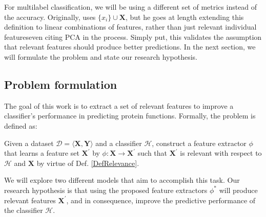 \par\noindent For multilabel classification, we will be using a different set
of metrics instead of the accuracy. Originally, \cite{blum1997selection} uses
$\{x_{i}\} \cup \mathbf{X}$, but he goes at length extending this definition
to linear combinations of features, rather than just relevant individual
features\textemdash even citing PCA in the process. Simply put, this
validates the assumption that relevant features should produce better
predictions. In the next section, we will formulate the problem and state our
research hypothesis.

\subsection{Problem formulation}

\par The goal of this work is to extract a set of relevant features to
improve a classifier's performance in predicting protein functions. Formally,
the problem is defined as:

\begin{definition}
  Given a dataset $\mathcal{D}=\langle \mathbf{X}, \mathbf{Y} \rangle$ and a
  classifier $\mathcal{H}$, construct a feature extractor $\phi$ that learns
  a feature set $\mathbf{X}^{\prime}$ by $\phi: \mathbf{X} \rightarrow
  \mathbf{X}^{\prime}$ such that $\mathbf{X}^{\prime}$ is relevant with respect
  to $\mathcal{H}$ and $\mathbf{X}$ by virtue of Def. \ref{DefRelevance}.
\end{definition}

\par We will explore two different models that aim to accomplish this task.
Our research hypothesis is that using the proposed feature extractors
$\phi^{\ast}$ will produce relevant features $\mathbf{X}^{\prime}$, and in
consequence, improve the predictive performance of the classifier
$\mathcal{H}$.